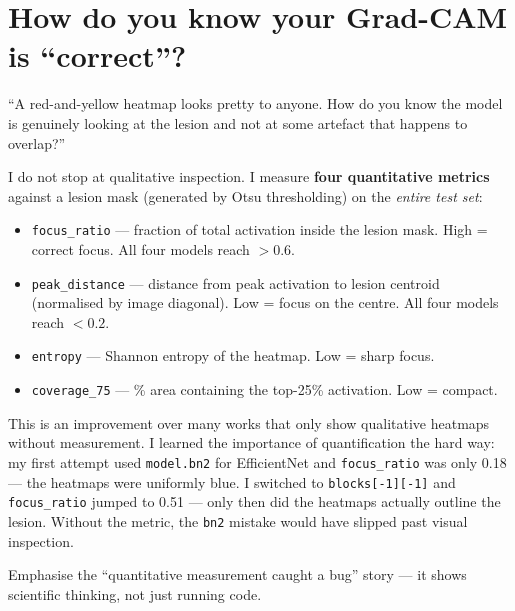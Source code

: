 \documentclass[11pt,a4paper]{article}
\begin{document}
\section{How do you know your Grad-CAM is ``correct''?}

\begin{question}
``A red-and-yellow heatmap looks pretty to anyone. How do you know the model is genuinely looking at the lesion and not at some artefact that happens to overlap?''
\end{question}

\begin{answer}
I do not stop at qualitative inspection. I measure \textbf{four quantitative metrics} against a lesion mask (generated by Otsu thresholding) on the \textit{entire test set}:

\begin{itemize}[leftmargin=*]
  \item \texttt{focus\_ratio} --- fraction of total activation inside the lesion mask. High = correct focus. All four models reach $> 0.6$.
  \item \texttt{peak\_distance} --- distance from peak activation to lesion centroid (normalised by image diagonal). Low = focus on the centre. All four models reach $< 0.2$.
  \item \texttt{entropy} --- Shannon entropy of the heatmap. Low = sharp focus.
  \item \texttt{coverage\_75} --- \% area containing the top-25\% activation. Low = compact.
\end{itemize}

This is an improvement over many works that only show qualitative heatmaps without measurement. I learned the importance of quantification the hard way: my first attempt used \texttt{model.bn2} for EfficientNet and \texttt{focus\_ratio} was only 0.18 --- the heatmaps were uniformly blue. I switched to \texttt{blocks[-1][-1]} and \texttt{focus\_ratio} jumped to 0.51 --- only then did the heatmaps actually outline the lesion. Without the metric, the \texttt{bn2} mistake would have slipped past visual inspection.
\end{answer}

\begin{tip}
Emphasise the ``quantitative measurement caught a bug'' story --- it shows scientific thinking, not just running code.
\end{tip}

\end{document}
